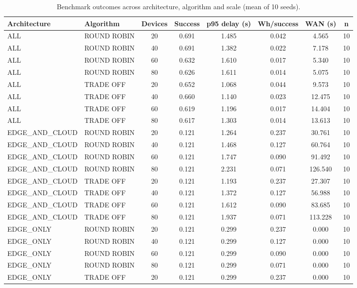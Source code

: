 \begin{table}
\centering
\small
\caption{Benchmark outcomes across architecture, algorithm and scale (mean of 10 seeds).}
\label{tab:p1-scale}
\begin{tabular}{llcccccc}
\toprule
Architecture & Algorithm & Devices & Success & p95 delay (s) & Wh/success & WAN (s) & n \\
\midrule
ALL & ROUND ROBIN & 20 & 0.691 & 1.485 & 0.042 & 4.565 & 10 \\
ALL & ROUND ROBIN & 40 & 0.691 & 1.382 & 0.022 & 7.178 & 10 \\
ALL & ROUND ROBIN & 60 & 0.632 & 1.610 & 0.017 & 5.340 & 10 \\
ALL & ROUND ROBIN & 80 & 0.626 & 1.611 & 0.014 & 5.075 & 10 \\
ALL & TRADE OFF & 20 & 0.652 & 1.068 & 0.044 & 9.573 & 10 \\
ALL & TRADE OFF & 40 & 0.660 & 1.140 & 0.023 & 12.475 & 10 \\
ALL & TRADE OFF & 60 & 0.619 & 1.196 & 0.017 & 14.404 & 10 \\
ALL & TRADE OFF & 80 & 0.617 & 1.303 & 0.014 & 13.613 & 10 \\
EDGE\_AND\_CLOUD & ROUND ROBIN & 20 & 0.121 & 1.264 & 0.237 & 30.761 & 10 \\
EDGE\_AND\_CLOUD & ROUND ROBIN & 40 & 0.121 & 1.468 & 0.127 & 60.764 & 10 \\
EDGE\_AND\_CLOUD & ROUND ROBIN & 60 & 0.121 & 1.747 & 0.090 & 91.492 & 10 \\
EDGE\_AND\_CLOUD & ROUND ROBIN & 80 & 0.121 & 2.231 & 0.071 & 126.540 & 10 \\
EDGE\_AND\_CLOUD & TRADE OFF & 20 & 0.121 & 1.193 & 0.237 & 27.307 & 10 \\
EDGE\_AND\_CLOUD & TRADE OFF & 40 & 0.121 & 1.372 & 0.127 & 56.988 & 10 \\
EDGE\_AND\_CLOUD & TRADE OFF & 60 & 0.121 & 1.612 & 0.090 & 83.685 & 10 \\
EDGE\_AND\_CLOUD & TRADE OFF & 80 & 0.121 & 1.937 & 0.071 & 113.228 & 10 \\
EDGE\_ONLY & ROUND ROBIN & 20 & 0.121 & 0.299 & 0.237 & 0.000 & 10 \\
EDGE\_ONLY & ROUND ROBIN & 40 & 0.121 & 0.299 & 0.127 & 0.000 & 10 \\
EDGE\_ONLY & ROUND ROBIN & 60 & 0.121 & 0.299 & 0.090 & 0.000 & 10 \\
EDGE\_ONLY & ROUND ROBIN & 80 & 0.121 & 0.299 & 0.071 & 0.000 & 10 \\
EDGE\_ONLY & TRADE OFF & 20 & 0.121 & 0.299 & 0.237 & 0.000 & 10 \\

\end{tabular}
\end{table}
